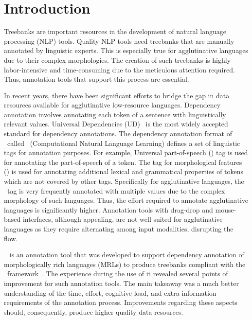 \section{Introduction}
\label{sec:introduction}

Treebanks are important resources in the development of natural language processing (NLP) tools.
Quality NLP tools need treebanks that are manually annotated by linguistic experts.
This is especially true for agglutinative languages due to their complex morphologies.
The creation of such treebanks is highly labor-intensive and time-consuming due to the meticulous attention required.
Thus, annotation tools that support this process are essential.

In recent years, there have been significant efforts to bridge the gap in data resources available for agglutinative low-resource languages.
Dependency annotation involves annotating each token of a sentence with linguistically relevant values.
Universal Dependencies (UD)~\cite{UD} is the most widely accepted standard for dependency annotations.
The dependency annotation format of \ud\ called \conllu\ (Computational Natural Language Learning) defines a set of linguistic tags for annotation purposes.
For example, Universal part-of-speech (\upos) tag is used for annotating the part-of-speech of a token.
The tag for morphological features (\feats) is used for annotating additional lexical and grammatical properties of tokens which are not covered by other tags.
Specifically for agglutinative languages, the \feats\ tag is very frequently annotated with multiple values due to the complex morphology of such languages.
Thus, the effort required to annotate agglutinative languages is significantly higher.
Annotation tools with drag-drop and mouse-based interfaces, although appealing, are not well suited for agglutinative languages as they require alternating among input modalities, disrupting the flow.

\boatvone~\cite{turk2021resources} is an annotation tool that was developed to support dependency annotation of morphologically rich languages (MRLs) to produce treebanks compliant with the \ud\ framework~\cite{UD}.
The experience during the use of it revealed several points of improvement for such annotation tools.
The main takeaway was a much better understanding of the time, effort, cognitive load, and extra information requirements of the annotation process.
Improvements regarding these aspects should, consequently, produce higher quality data resources.

